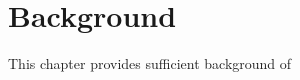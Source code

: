 \chapter{Background} \label{chap:bkg}

This chapter provides sufficient background of 

\label{sec:bkg.rrc}

